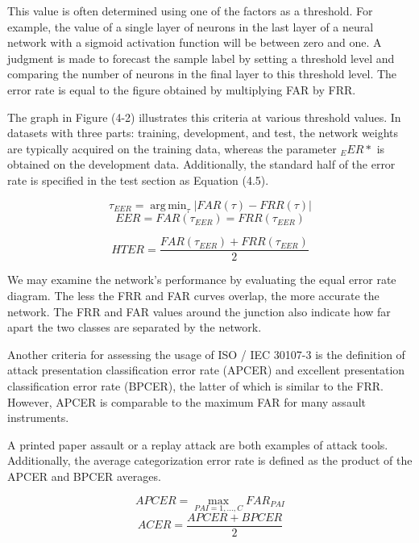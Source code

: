 \documentclass[journal]{IEEEtran}
\DeclareMathOperator*{\argmin}{arg\,min}
\begin{document}
This value is often determined using one of the factors as a threshold. For example, the value of a single layer of neurons in the last layer of a neural network with a sigmoid activation function will be between zero and one. A judgment is made to forecast the sample label by setting a threshold level and comparing the number of neurons in the final layer to this threshold level. The error rate is equal to the figure obtained by multiplying FAR by FRR.

The graph in Figure (4-2) illustrates this criteria at various threshold values.
In datasets with three parts: training, development, and test, the network weights are typically acquired on the training data, whereas the parameter $_EER *$ is obtained on the development data.
Additionally, the standard half of the error rate is specified in the test section as Equation (4.5).


\begin{equation}\label{eq:taueer}
	\tau_{EER} = \argmin_{\tau}|FAR(\tau)-FRR(\tau)|
\end{equation}
\begin{equation}\label{eq:eer}
	EER=FAR(\tau_{EER})=FRR(\tau_{EER})
\end{equation}

\begin{equation}\label{eq:hter}
	HTER=\frac{FAR(\tau_{EER})+FRR(\tau_{EER})}{2}
\end{equation}

We may examine the network's performance by evaluating the equal error rate diagram.
The less the FRR and FAR curves overlap, the more accurate the network.
The FRR and FAR values around the junction also indicate how far apart the two classes are separated by the network.

Another criteria for assessing the usage of ISO / IEC 30107-3 is the definition of attack presentation classification error rate (APCER) and excellent presentation classification error rate (BPCER), the latter of which is similar to the FRR.
However, APCER is comparable to the maximum FAR for many assault instruments.

A printed paper assault or a replay attack are both examples of attack tools.
Additionally, the average categorization error rate is defined as the product of the APCER and BPCER averages.

\begin{equation}\label{eq:apcer}
	APCER=\max_{PAI=1,...,C}{FAR_{PAI}}
\end{equation}
\begin{equation}\label{eq:ACER}
	ACER=\frac{APCER+BPCER}{2}
\end{equation}
\end{document}
